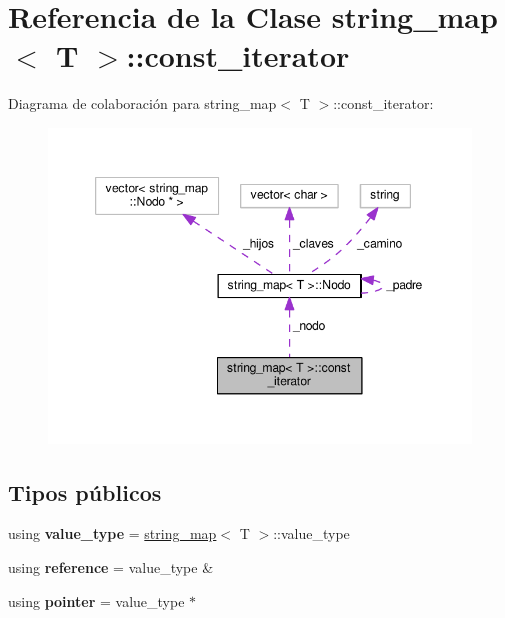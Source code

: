 \hypertarget{classstring__map_1_1const__iterator}{\section{Referencia de la Clase string\-\_\-map$<$ T $>$\-:\-:const\-\_\-iterator}
\label{classstring__map_1_1const__iterator}
}


Diagrama de colaboración para string\-\_\-map$<$ T $>$\-:\-:const\-\_\-iterator\-:
\nopagebreak
\begin{figure}[H]
\begin{center}
\leavevmode
\includegraphics[width=349pt]{classstring__map_1_1const__iterator__coll__graph}
\end{center}
\end{figure}
\subsection*{Tipos públicos}
\begin{DoxyCompactItemize}
\item 
\hypertarget{classstring__map_1_1const__iterator_aca26e411b4326a7c43af783a3256cdbd}{using {\bfseries value\-\_\-type} = \hyperlink{classstring__map}{string\-\_\-map}$<$ T $>$\-::value\-\_\-type}\label{classstring__map_1_1const__iterator_aca26e411b4326a7c43af783a3256cdbd}

\item 
\hypertarget{classstring__map_1_1const__iterator_a9040c24531a149fbb6d4718786155234}{using {\bfseries reference} = value\-\_\-type \&}\label{classstring__map_1_1const__iterator_a9040c24531a149fbb6d4718786155234}

\item 
\hypertarget{classstring__map_1_1const__iterator_a1b3a30bbc774ac416d551b2c023cf6d7}{using {\bfseries pointer} = value\-\_\-type $\ast$}\label{classstring__map_1_1const__iterator_a1b3a30bbc774ac416d551b2c023cf6d7}

\end{DoxyCompactItemize}
